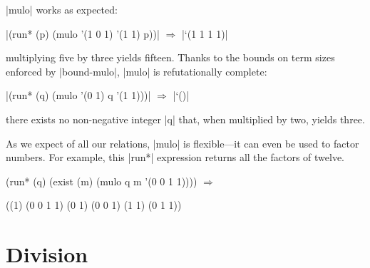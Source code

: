 \scheme|mulo| works as expected:

\wspace

\noindent\scheme|(run* (p) (mulo '(1 0 1) '(1 1) p))| $\Rightarrow$ \scheme|`(1 1 1 1)|

\wspace

\noindent multiplying five by three yields fifteen. Thanks to the
bounds on term sizes enforced by \scheme|bound-mulo|, \scheme|mulo| is
refutationally complete:

\wspace

\noindent\scheme|(run* (q) (mulo '(0 1) q '(1 1)))| $\Rightarrow$ \scheme|`()|

\wspace

\noindent there exists no non-negative integer \scheme|q| that, when
multiplied by two, yields three.

As we expect of all our relations, \scheme|mulo| is flexible---it can
even be used to factor numbers.  For example, this \scheme|run*|
expression returns all the factors of twelve.

\newpage

\begin{schemedisplay}
(run* (q) 
  (exist (m)
    (mulo q m '(0 0 1 1)))) $\Rightarrow$
\end{schemedisplay}
\nspace
\begin{schemeresponse}
((1) (0 0 1 1) (0 1) (0 0 1) (1 1) (0 1 1))
\end{schemeresponse}

%



\section{Division}\label{arithdivision}

